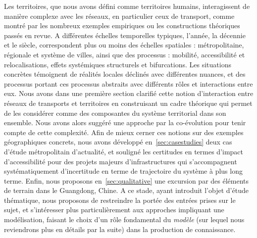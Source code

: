 Les territoires, que nous avons défini comme territoires humains, interagissent de manière complexe avec les réseaux, en particulier ceux de transport, comme montré par les nombreux exemples empiriques ou les constructions théoriques passés en revue. A différentes échelles temporelles typiques, l'année, la décennie et le siècle, correspondent plus ou moins des échelles spatiales : métropolitaine, régionale et système de villes, ainsi que des processus : mobilité, accessibilité et relocalisations, effets systémiques structurels et bifurcations. Les situations concrètes témoignent de réalités locales déclinés avec différentes nuances, et des processus portant ces processus abstraits avec différents rôles et interactions entre eux. Nous avons dans une première section clarifié cette notion d'interaction entre réseaux de transports et territoires en construisant un cadre théorique qui permet de les considérer comme des composantes du système territorial dans son ensemble. Nous avons alors suggéré une approche par la co-évolution pour tenir compte de cette complexité. Afin de mieux cerner ces notions sur des exemples géographiques concrets, nous avons développé en~\ref{sec:casestudies} deux cas d'étude métropolitain d'actualité, et souligné les certitudes en termes d'impact d'accessibilité pour des projets majeurs d'infrastructures qui s'accompagnent systématiquement d'incertitude en terme de trajectoire du système à plus long terme. Enfin, nous proposons en~\ref{sec:qualitative} une excursion par des éléments de terrain dans le Guangdong, Chine. A ce stade, ayant introduit l'objet d'étude thématique, nous proposons de restreindre la portée des entrées prises sur le sujet, et s'intéresser plus particulièrement aux approches impliquant une modélisation, faisant le choix d'un rôle fondamental du \emph{modèle} (sur lequel nous reviendrons plus en détails par la suite) dans la production de connaissance.






\stars






